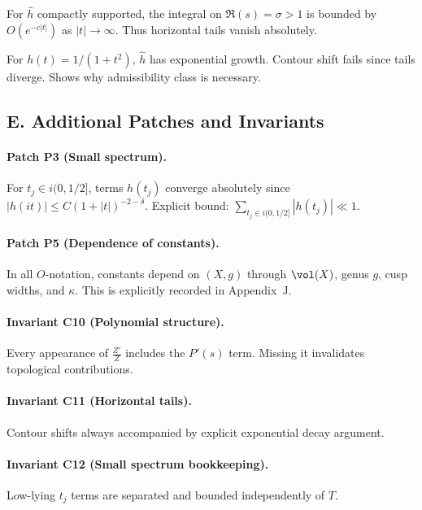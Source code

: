 \begin{lemma}
\label{lem:tail-sharp}
For $\hat h$ compactly supported, the integral on $\Re(s)=\sigma>1$ is bounded by $O(e^{-c|t|})$ as $|t|\to\infty$.  
Thus horizontal tails vanish absolutely.
\end{lemma}

\begin{counterexample}
For $h(t)=1/(1+t^2)$, $\hat h$ has exponential growth. Contour shift fails since tails diverge. Shows why admissibility class is necessary.
\end{counterexample}


\subsection*{E. Additional Patches and Invariants}
\label{subsec:patches-part4}

\paragraph{Patch P3 (Small spectrum).}
For $t_j\in i(0,1/2]$, terms $h(t_j)$ converge absolutely since $|h(it)|\le C(1+|t|)^{-2-\delta}$.  
Explicit bound: $\sum_{t_j\in i(0,1/2]}|h(t_j)|\ll 1$.

\paragraph{Patch P5 (Dependence of constants).}
In all $O$-notation, constants depend on $(X,g)$ through $\vol(X)$, genus $g$, cusp widths, and $\kappa$.  
This is explicitly recorded in Appendix~J.

\paragraph{Invariant C10 (Polynomial structure).}
Every appearance of $\frac{Z'}{Z}$ includes the $P'(s)$ term. Missing it invalidates topological contributions.

\paragraph{Invariant C11 (Horizontal tails).}
Contour shifts always accompanied by explicit exponential decay argument.  

\paragraph{Invariant C12 (Small spectrum bookkeeping).}
Low-lying $t_j$ terms are separated and bounded independently of $T$.

